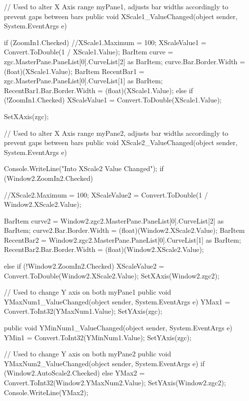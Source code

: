{{        // Used to alter X Axis range myPane1, adjusts bar widths accordingly to prevent gaps between bars
        public void XScale1_ValueChanged(object sender, System.EventArgs e)
        {
            if (ZoomIn1.Checked)
            {
                //XScale1.Maximum = 100;
                XScaleValue1 = Convert.ToDouble(1 / XScale1.Value);
                BarItem curve = zgc.MasterPane.PaneList[0].CurveList[2] as BarItem;
                curve.Bar.Border.Width = (float)(XScale1.Value);
                BarItem RecentBar1 = zgc.MasterPane.PaneList[0].CurveList[1] as BarItem;
                RecentBar1.Bar.Border.Width = (float)(XScale1.Value);
            }
            else if (!ZoomIn1.Checked)
            {
                XScaleValue1 = Convert.ToDouble(XScale1.Value);
            }

            SetXAxis(zgc);
        }

        // Used to alter X Axis range myPane2, adjusts bar widths accordingly to prevent gaps between bars
        public void XScale2_ValueChanged(object sender, System.EventArgs e)
        {
            Console.WriteLine("Into XScale2 Value Changed");
            if (Window2.ZoomIn2.Checked)
            {
                //XScale2.Maximum = 100;
                XScaleValue2 = Convert.ToDouble(1 / Window2.XScale2.Value);

                BarItem curve2 = Window2.zgc2.MasterPane.PaneList[0].CurveList[2] as BarItem;
                curve2.Bar.Border.Width = (float)(Window2.XScale2.Value);
                BarItem RecentBar2 = Window2.zgc2.MasterPane.PaneList[0].CurveList[1] as BarItem;
                RecentBar2.Bar.Border.Width = (float)(Window2.XScale2.Value);

            }
            else if (!Window2.ZoomIn2.Checked)
            {
                XScaleValue2 = Convert.ToDouble(Window2.XScale2.Value);
            }
            SetXAxis(Window2.zgc2);
        }

        // Used to change Y axis on both myPane1
        public void YMaxNum1_ValueChanged(object sender, System.EventArgs e)
        {
            YMax1 = Convert.ToInt32(YMaxNum1.Value);
            SetYAxis(zgc);
        }

        public void YMinNum1_ValueChanged(object sender, System.EventArgs e)
        {
            YMin1 = Convert.ToInt32(YMinNum1.Value);
            SetYAxis(zgc);
        }
        
        // Used to change Y axis on both myPane2
        public void YMaxNum2_ValueChanged(object sender, System.EventArgs e)
        {
            if (Window2.AutoScale2.Checked)
            {
            }
            else
            {
                YMax2 = Convert.ToInt32(Window2.YMaxNum2.Value);
                SetYAxis(Window2.zgc2);
                Console.WriteLine(YMax2);
            }
        }

}}
